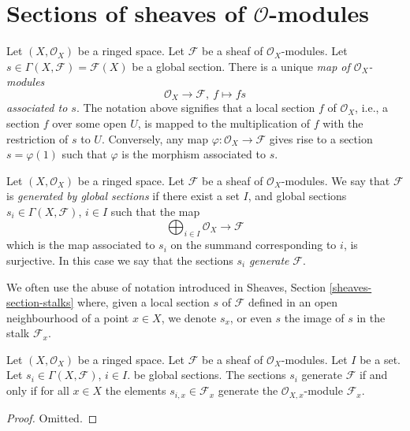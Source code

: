 \section{Sections of sheaves of $\mathcal{O}$-modules}
\label{section-sections}

\noindent
Let $(X, \mathcal{O}_X)$ be a ringed space.
Let $\mathcal{F}$ be a sheaf of $\mathcal{O}_X$-modules.
Let $s \in \Gamma(X, \mathcal{F}) = \mathcal{F}(X)$ be a
global section. There is a unique {\it map of $\mathcal{O}_X$-modules
$$
\mathcal{O}_X \longrightarrow \mathcal{F}, \ f \longmapsto fs
$$
associated to $s$}. The notation above signifies that a local
section $f$ of $\mathcal{O}_X$, i.e., a section $f$ over some open $U$,
is mapped to the multiplication of $f$ with the restriction of $s$ to
$U$. Conversely, any map $\varphi : \mathcal{O}_X \to \mathcal{F}$
gives rise to a section $s = \varphi(1)$ such that $\varphi$ is
the morphism associated to $s$.

\begin{definition}
\label{definition-globally-generated}
Let $(X, \mathcal{O}_X)$ be a ringed space.
Let $\mathcal{F}$ be a sheaf of $\mathcal{O}_X$-modules.
We say that $\mathcal{F}$ is {\it generated by global
sections} if there exist a set $I$, and
global sections $s_i \in \Gamma(X, \mathcal{F})$, $i \in I$
such that the map
$$
\bigoplus\nolimits_{i \in I}
\mathcal{O}_X \longrightarrow \mathcal{F}
$$
which is the map associated to $s_i$ on the summand corresponding to $i$,
is surjective. In this case we say that the sections $s_i$
{\it generate} $\mathcal{F}$.
\end{definition}

\noindent
We often use the abuse of notation introduced in
Sheaves, Section \ref{sheaves-section-stalks} where, given a local
section $s$ of $\mathcal{F}$ defined in an open neighbourhood
of a point $x \in X$, we denote $s_x$, or even $s$ the image of $s$
in the stalk $\mathcal{F}_x$.

\begin{lemma}
\label{lemma-globally-generated}
Let $(X, \mathcal{O}_X)$ be a ringed space.
Let $\mathcal{F}$ be a sheaf of $\mathcal{O}_X$-modules.
Let $I$ be a set. Let
$s_i \in \Gamma(X, \mathcal{F})$, $i \in I$.
be global sections. The sections $s_i$ generate
$\mathcal{F}$ if and only if for all $x\in X$ the
elements $s_{i, x} \in \mathcal{F}_x$ generate
the $\mathcal{O}_{X, x}$-module $\mathcal{F}_x$.
\end{lemma}

\begin{proof}
Omitted.
\end{proof}

